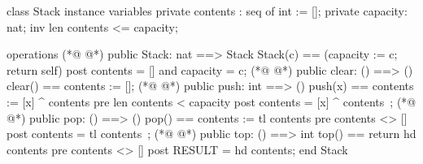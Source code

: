 \begin{vdmpp}[breaklines=true]
class Stack
 instance variables
 private contents : seq of int := [];
 private capacity: nat;
 inv len contents <= capacity;

 operations
(*@
\label{Stack:8}
@*)
 public Stack: nat ==> Stack
 Stack(c) == (capacity := c; return self)
 post contents = [] and capacity = c;
(*@
\label{clear:11}
@*)
 public clear: () ==> ()
 clear() == contents := [];
(*@
\label{push:13}
@*)
 public push: int ==> ()
 push(x) == contents := [x] ^ contents
 pre len contents < capacity
 post contents = [x] ^ contents~;
(*@
\label{pop:17}
@*)
 public pop: () ==> ()
 pop() == contents := tl contents
 pre contents <> []
 post contents = tl contents~;
(*@
\label{top:21}
@*)
 public top: () ==> int
 top() == return hd contents
 pre contents <> []
 post RESULT = hd contents;
end Stack



\end{vdmpp}
